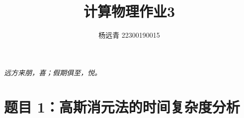 \documentclass[11pt]{article}
\author{杨远青 22300190015}
\title{计算物理作业3}
\begin{document}
\maketitle
\textit{远方来朋，喜；假期俱至，悦。}
\section{题目 1：高斯消元法的时间复杂度分析}


\vspace{5pt}
\end{document}
